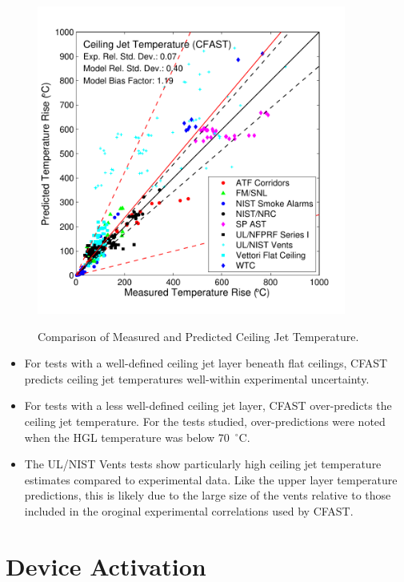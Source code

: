 \begin{figure}
\begin{center}
\includegraphics[width=4.0in]{FIGURES/ScatterPlots/Ceiling_Jet_Temperature}  \\
\end{center}
\caption{Comparison of Measured and Predicted Ceiling Jet Temperature.} \label{fig:Ceiling_Jet_Scatter}
\end{figure}

\begin{itemize}
\item For tests with a well-defined ceiling jet layer beneath flat ceilings, CFAST predicts ceiling jet temperatures well-within experimental uncertainty.
\item For tests with a less well-defined ceiling jet layer, CFAST over-predicts the ceiling jet temperature.  For the tests studied, over-predictions were noted when the HGL temperature was below 70~$^\circ$C.
\item The UL/NIST Vents tests show particularly high ceiling jet temperature estimates compared to experimental data.  Like the upper layer temperature predictions, this is likely due to the large size of the vents relative to those included in the oroginal experimental correlations used by CFAST.
\end{itemize}

\section{Device Activation}


